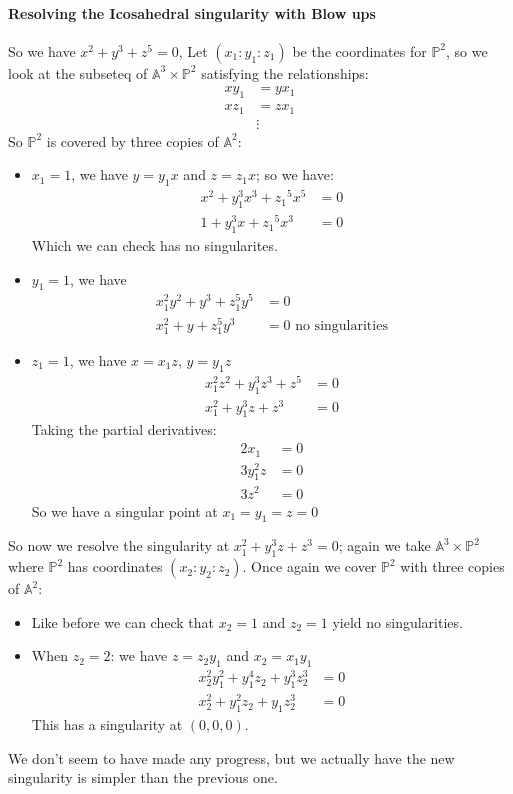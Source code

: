 \paragraph*{Resolving the Icosahedral singularity with Blow ups}
So we have $x^2+y^3+z^5 = 0$,    
Let $(x_1\colon y_1\colon z_1)$ be the coordinates for $\mathbb{P}^2$, so we look at the subseteq of $\mathbb{A}^3\times \mathbb{P}^2$ satisfying the relationships:\begin{align*}
        xy_1 &= yx_1\\
        xz_1 &= zx_1\\
        &\vdots
    \end{align*}
    So $\mathbb{P}^2$ is covered by three copies of $\mathbb{A}^2$:\begin{itemize}
        \item $x_1 = 1$, we have $y = y_1x$ and $z=z_1x$; so we have:\begin{align*}
            x^2 + y_1^3 x^3 + {z_1}^5 x^5 &= 0\\
            1 + y_1^3 x + {z_1}^5 x^3 &= 0
        \end{align*}
        Which we can check has no singularites.
        \item $y_1 = 1$, we have\begin{align*}
            x_1^2y^2+y^3+z_1^5y^5&=0\\
            x_1^2+y+z_1^5y^3 &=0 \text{ no singularities}
        \end{align*} 
        \item $z_1 = 1$, we have $x=x_1z$, $y=y_1z$\begin{align*}
                x_1^2z^2+y_1^3z^3+z^5 &= 0 \\
                x_1^2+y_1^3z+z^3 &= 0
        \end{align*}
        Taking the partial derivatives:\begin{align*}
            2x_1 &=0\\
            3y_1^2z &=0\\
            3z^2 &=0
        \end{align*}
        So we have a singular point at $x_1=y_1=z=0$
    \end{itemize}

    So now we resolve the singularity at $x_1^2+y_1^3z+z^3 = 0$; again we take $\mathbb{A}^3\times \mathbb{P}^2$ where $\mathbb{P}^2$ has coordinates $(x_2\colon y_2\colon z_2)$.
    Once again we cover $\mathbb{P}^2$ with three copies of $\mathbb{A}^2$:\begin{itemize}
        \item Like before we can check that $x_2=1$ and $z_2=1$ yield no singularities.
        \item When $z_2 = 2$: we have $z=z_2y_1$ and $x_2 = x_1y_1$\begin{align*}
            x_2^2 y_1^2+y_1^4z_2+y_1^3 z_2^3 &=0\\
            x_2^2+y_1^2 z_2+ y_1z_2^3&=0
        \end{align*} 
        This has a singularity at $(0,0,0)$.
    \end{itemize}
    We don't seem to have made any progress, but we actually have the new singularity is simpler than the previous one.

